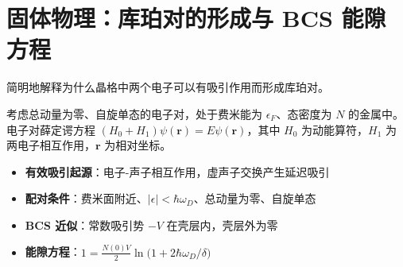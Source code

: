 \section{固体物理：库珀对的形成与 BCS 能隙方程}
\label{sec:cooper-pair-bcs}

\begin{modelbox}[题目：电子-声子吸引与库珀对结合能]
简明地解释为什么晶格中两个电子可以有吸引作用而形成库珀对。

考虑总动量为零、自旋单态的电子对，处于费米能为 $\epsilon_F$、态密度为 $N$ 的金属中。电子对薛定谔方程 $(H_0+H_1)\psi(\bm{r})=E\psi(\bm{r})$，其中 $H_0$ 为动能算符，$H_1$ 为两电子相互作用，$\bm{r}$ 为相对坐标。
\end{modelbox}

\begin{tipbox}[考点快速分析]
\begin{itemize}
    \item \textbf{有效吸引起源}：电子-声子相互作用，虚声子交换产生延迟吸引
    \item \textbf{配对条件}：费米面附近、$|\epsilon|<\hbar\omega_D$、总动量为零、自旋单态
    \item \textbf{BCS 近似}：常数吸引势 $-V$ 在壳层内，壳层外为零
    \item \textbf{能隙方程}：$1=\frac{N(0)V}{2}\ln\!\bigl(1+2\hbar\omega_D/\delta\bigr)$
\end{itemize}
\end{tipbox}

